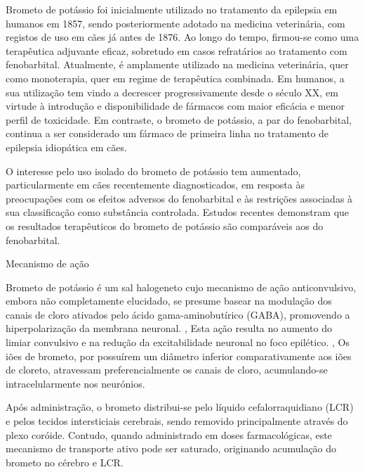 Brometo de potássio foi inicialmente utilizado no tratamento da epilepsia em humanos em 1857, sendo posteriormente adotado na medicina veterinária, com registos de uso em cães já antes de 1876. \cite{javmakbr} Ao longo do tempo, firmou-se como uma terapêutica adjuvante eficaz, sobretudo em casos refratários ao tratamento com fenobarbital.  \cite{Lichtenauer2022} Atualmente, é amplamente utilizado na medicina veterinária, quer como monoterapia, quer em regime de terapêutica combinada. \cite{Lichtenauer2022}\cite{Fantinati2021}\cite{Gouveia2024} \cite{Dr}\cite{vol16} Em humanos, a sua utilização tem vindo a decrescer progressivamente desde o século XX, \cite{Lichtenauer2022} \cite{Dr} em virtude à introdução e disponibilidade de fármacos com maior eficácia e menor perfil de toxicidade. \cite{Lichtenauer2022} Em contraste, o brometo de potássio, a par do fenobarbital, continua a ser considerado um fármaco de primeira linha no tratamento de epilepsia idiopática em cães. \cite{javmakbr} 


O interesse pelo uso isolado do brometo de potássio tem aumentado, particularmente em cães recentemente diagnosticados, em resposta às preocupações com os efeitos adversos do fenobarbital e às restrições associadas à sua classificação como substância controlada. \cite{javmakbr} Estudos recentes demonstram que os resultados terapêuticos do brometo de potássio são comparáveis aos do fenobarbital. \cite{Lichtenauer2022} 


Mecanismo de ação


Brometo de potássio é um sal halogeneto \cite{javmakbr} cujo mecanismo de ação anticonvulsivo, embora não completamente elucidado, se presume basear na modulação dos canais de cloro ativados pelo ácido gama-aminobutírico (GABA), promovendo a hiperpolarização da membrana neuronal. \cite{javmakbr}, \cite{Fantinati2021} \cite{Gouveia2024} Esta ação resulta no aumento do limiar convulsivo e na redução da excitabilidade neuronal no foco epilético. \cite{javmakbr}, \cite{Fantinati2021} \cite{Gouveia2024} Os iões de brometo, por possuírem um diâmetro inferior comparativamente aos iões de cloreto, atravessam preferencialmente os canais de cloro, acumulando-se intracelularmente nos neurónios. \cite{javmakbr} \cite{Gouveia2024} 


Após administração, o brometo distribui-se pelo líquido cefalorraquidiano (LCR) e pelos tecidos intersticiais cerebrais, sendo removido principalmente através do plexo coróide. \cite{javmakbr} Contudo, quando administrado em doses farmacológicas, este mecanismo de transporte ativo pode ser saturado, originando acumulação do brometo no cérebro e LCR. \cite{javmakbr}

